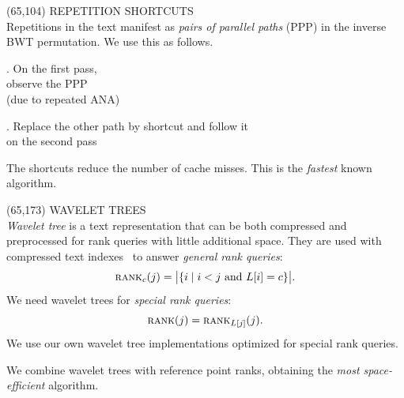 \documentclass[a4paper]{article} %
\newcommand{\rank}{\textsc{rank}}
\begin{document}
\begin{textblock}{60}(65,104) 
  {\sffamily\normalsize{\color{sciorange}
      REPETITION SHORTCUTS}}\vspace{1mm}\\
  \footnotesize 
  Repetitions in the text manifest as \emph{pairs of parallel paths}
  (PPP) in the inverse BWT permutation. We use this as follows.
  \vspace{3mm}

  \begin{minipage}[t]{29mm}
    \scriptsize\sffamily
    . On the {\color{first}first pass},\\observe the PPP\\
    (due to repeated ANA)
    \begin{center}
      
    \end{center}
  \end{minipage}
  \hfill
  \begin{minipage}[t]{29mm}
    \scriptsize\sffamily
    . Replace the {\color{second}other path} by shortcut and
    follow it\\on the second pass
    \begin{center}
      
    \end{center}
  \end{minipage}
  \vspace{3mm}
  
  The shortcuts reduce the number of cache misses.  This is the
  \emph{fastest} known algorithm.
\end{textblock} 

\begin{textblock}{60}(65,173)
  {\sffamily\normalsize{\color{sciorange}
      WAVELET TREES}}\vspace{1mm}\\
  \footnotesize 
  \emph{Wavelet tree} is a text representation that can be both
  compressed and preprocessed for rank que\-ries with little
  additional space.  They are used with compressed text
  indexes~\cite{nm2007} to answer \emph{general rank queries}:
  \[
  \rank_c(j)=\big|\{i \mid i<j \textrm{ and }
  L[i]=c\}\big|.
  \]
  We need wavelet trees for \emph{special rank queries}:
  \[
  \rank(j)=\rank_{L[j]}(j).
  \]
  We use our own wavelet tree implementations optimized for special
  rank queries.
  \vspace{1mm}

  We combine wavelet trees with reference point
  ranks, obtaining the \emph{most space-efficient} algorithm.
\end{textblock} 
	
\end{document}
